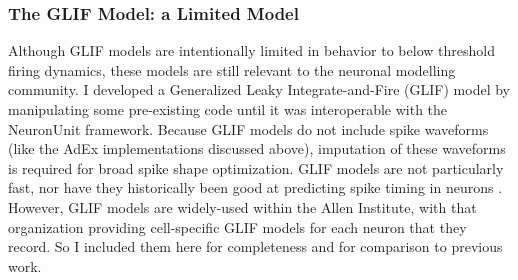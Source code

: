 



\subsubsection{The GLIF Model: a Limited Model}
Although GLIF models are intentionally limited in behavior to below threshold firing dynamics, these models are still relevant to the neuronal modelling community.
I developed a Generalized Leaky Integrate-and-Fire (GLIF) model by manipulating some pre-existing code until it was interoperable with the NeuronUnit framework.
Because GLIF models do not include spike waveforms (like the AdEx implementations discussed above), imputation of these waveforms is required for broad spike shape optimization.
GLIF models are not particularly fast, nor have they historically been good at predicting  spike timing in neurons \cite{teeter2018generalized}.
However, GLIF models are widely-used within the Allen Institute, with that organization providing cell-specific GLIF models for each neuron that they record.
So I included them here for completeness and for comparison to previous work.

